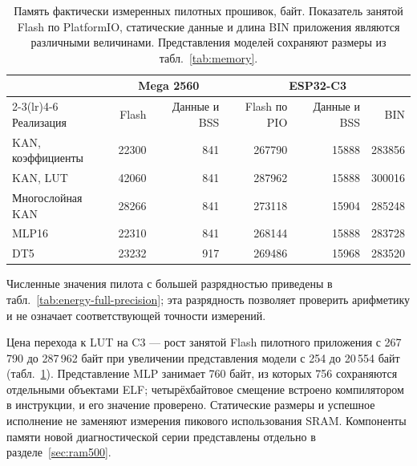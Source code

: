 \begin{table}[!htbp]
\centering\footnotesize\setlength{\tabcolsep}{5pt}
\caption{Память фактически измеренных пилотных прошивок, байт. Показатель занятой Flash по PlatformIO, статические данные и длина BIN приложения являются различными величинами. Представления моделей сохраняют размеры из табл.~\ref{tab:memory}.}
\label{tab:energy-memory}
\begin{tabular}{lrrrrr}
\toprule
& \multicolumn{2}{c}{Mega 2560} & \multicolumn{3}{c}{ESP32-C3}\\
\cmidrule(lr){2-3}\cmidrule(lr){4-6}
Реализация & Flash & Данные и BSS & Flash по PIO & Данные и BSS & BIN\\
\midrule
KAN, коэффициенты & 22300 & 841 & 267790 & 15888 & 283856\\
KAN, LUT & 42060 & 841 & 287962 & 15888 & 300016\\
Многослойная KAN & 28266 & 841 & 273118 & 15904 & 285248\\
MLP16 & 22310 & 841 & 268144 & 15888 & 283728\\
DT5 & 23232 & 917 & 269486 & 15968 & 283520\\
\bottomrule
\end{tabular}
\end{table}

Численные значения пилота с большей разрядностью приведены в табл.~\ref{tab:energy-full-precision}; эта разрядность позволяет проверить арифметику и не означает соответствующей точности измерений.

Цена перехода к LUT на C3 --- рост занятой Flash пилотного приложения с 267\,790 до 287\,962 байт при увеличении представления модели с 254 до 20\,554 байт (табл.~\ref{tab:energy-memory}). Представление MLP занимает 760 байт, из которых 756 сохраняются отдельными объектами ELF; четырёхбайтовое смещение встроено компилятором в инструкции, и его значение проверено. Статические размеры и успешное исполнение не заменяют измерения пикового использования SRAM. Компоненты памяти новой диагностической серии представлены отдельно в разделе~\ref{sec:ram500}.
